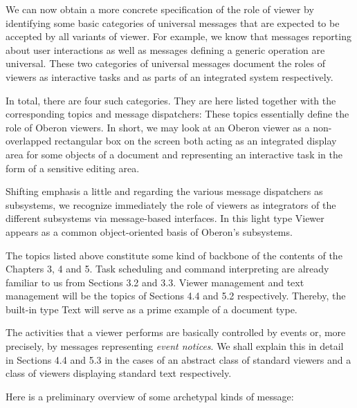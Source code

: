 We can now obtain a more concrete specification of the role of viewer
by identifying some basic categories of universal messages that are
expected to be accepted by all variants of viewer. For example, we
know that messages reporting about user interactions as well as
messages defining a generic operation are universal. These two
categories of universal messages document the roles of viewers as
interactive tasks and as parts of an integrated system respectively.

In total, there are four such categories. They are here listed
together with the corresponding topics and message dispatchers:
\medskip
{}
\medskip
These topics essentially define the role of Oberon viewers. In short,
we may look at an Oberon viewer as a non-overlapped rectangular box on
the screen both acting as an integrated display area for some objects
of a document and representing an interactive task in the form of a
sensitive editing area.

Shifting emphasis a little and regarding the various message
dispatchers as subsystems, we recognize immediately the role of
viewers as integrators of the different subsystems via message-based
interfaces. In this light type Viewer appears as a common
object-oriented basis of Oberon's subsystems.

The topics listed above constitute some kind of backbone of the
contents of the Chapters 3, 4 and 5. Task scheduling and command
interpreting are already familiar to us from Sections 3.2 and
3.3. Viewer management and text management will be the topics of
Sections 4.4 and 5.2 respectively. Thereby, the built-in type Text
will serve as a prime example of a document type.

The activities that a viewer performs are basically controlled by
events or, more precisely, by messages representing \emph{event notices}. We
shall explain this in detail in Sections 4.4 and 5.3 in the cases of
an abstract class of standard viewers and a class of viewers
displaying standard text respectively.

Here is a preliminary overview of some archetypal kinds of message:

